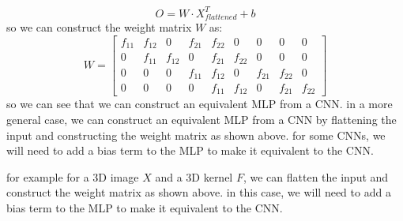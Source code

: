 \begin{qsolve}
\begin{qsolve}[]
        $$
            O = W \cdot X_{flattened}^T + b 
        $$
        so we can construct the weight matrix \(W\) as:
        \[
            W = \begin{bmatrix}
            f_{11} & f_{12} & 0 & f_{21} & f_{22} & 0 & 0 & 0 & 0 \\
            0 & f_{11} & f_{12} & 0 & f_{21} & f_{22} & 0 & 0 & 0 \\
            0 & 0 & 0 & f_{11} & f_{12} & 0 & f_{21} & f_{22} & 0 \\
            0 & 0 & 0 & 0 & f_{11} & f_{12} & 0 & f_{21} & f_{22}
            \end{bmatrix}
        \]
        \splitqsolve[\splitqsolve]
        so we can see that we can construct an equivalent MLP from a CNN. in a more general case, we can construct an equivalent MLP from a CNN by flattening the input and constructing the weight matrix as shown above. for some CNNs, we will need to add a bias term to the MLP to make it equivalent to the CNN.
        
        for example for a 3D image \(X\) and a 3D kernel \(F\), we can flatten the input and construct the weight matrix as shown above. in this case, we will need to add a bias term to the MLP to make it equivalent to the CNN.
    \end{qsolve}
\end{qsolve}